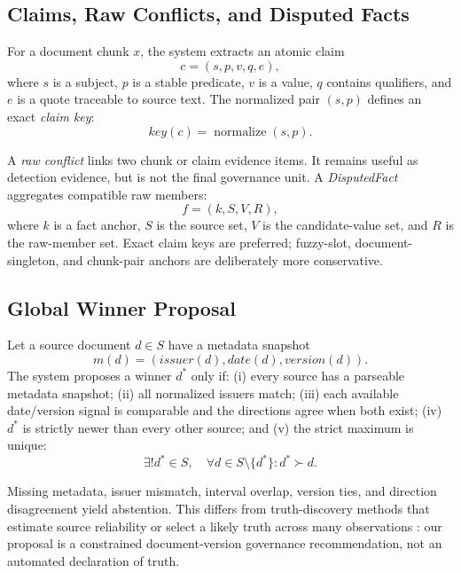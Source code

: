 \documentclass[conference]{IEEEtran}
\newcommand{\claimkey}{\textit{claim key}}
\newcommand{\disputedfact}{\textit{DisputedFact}}
\newcommand{\rawconflict}{\textit{raw conflict}}
\begin{document}
\subsection{Claims, Raw Conflicts, and Disputed Facts}

For a document chunk $x$, the system extracts an atomic claim
\begin{equation}
    c=(s,p,v,q,e),
\end{equation}
where $s$ is a subject, $p$ is a stable predicate, $v$ is a value, $q$ contains qualifiers, and $e$ is a quote traceable to source text. The normalized pair $(s,p)$ defines an exact \claimkey{}:
\begin{equation}
    key(c)=\operatorname{normalize}(s,p).
\end{equation}

A \rawconflict{} links two chunk or claim evidence items. It remains useful as detection evidence, but is not the final governance unit. A \disputedfact{} aggregates compatible raw members:
\begin{equation}
    f=(k,S,V,R),
\end{equation}
where $k$ is a fact anchor, $S$ is the source set, $V$ is the candidate-value set, and $R$ is the raw-member set. Exact claim keys are preferred; fuzzy-slot, document-singleton, and chunk-pair anchors are deliberately more conservative.

\subsection{Global Winner Proposal}

Let a source document $d\in S$ have a metadata snapshot
\begin{equation}
    m(d)=(issuer(d),date(d),version(d)).
\end{equation}
The system proposes a winner $d^*$ only if: (i) every source has a parseable metadata snapshot; (ii) all normalized issuers match; (iii) each available date/version signal is comparable and the directions agree when both exist; (iv) $d^*$ is strictly newer than every other source; and (v) the strict maximum is unique:
\begin{equation}
    \exists!d^*\in S,\quad \forall d\in S\setminus\{d^*\}:d^*\succ d.
\end{equation}

Missing metadata, issuer mismatch, interval overlap, version ties, and direction disagreement yield abstention. This differs from truth-discovery methods that estimate source reliability or select a likely truth across many observations \cite{yin2008truth,li2016truthsurvey}: our proposal is a constrained document-version governance recommendation, not an automated declaration of truth.
\end{document}
